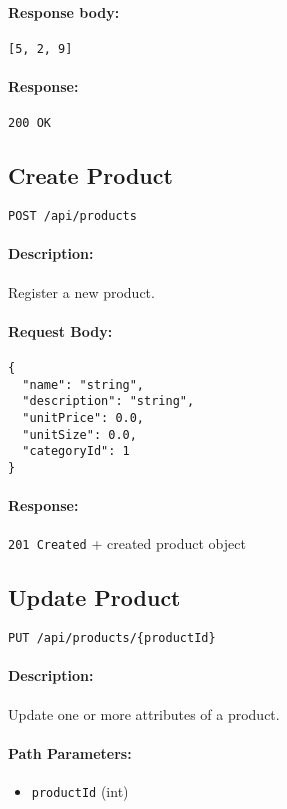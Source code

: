 \documentclass[a4paper,11pt]{article}
\begin{document}
\paragraph{Response body:}
\begin{verbatim}
[5, 2, 9]
\end{verbatim}
\paragraph{Response:} \texttt{200 OK}

\subsection{Create Product}
\label{sec:products-create}
\begin{verbatim}
POST /api/products
\end{verbatim}
\paragraph{Description:} Register a new product.
\paragraph{Request Body:}
\begin{verbatim}
{
  "name": "string",
  "description": "string",
  "unitPrice": 0.0,
  "unitSize": 0.0,
  "categoryId": 1
}
\end{verbatim}
\paragraph{Response:} \texttt{201 Created} + created product object

\subsection{Update Product}
\label{sec:products-update}
\begin{verbatim}
PUT /api/products/{productId}
\end{verbatim}
\paragraph{Description:} Update one or more attributes of a product.
\paragraph{Path Parameters:}
\begin{itemize}
  \item \texttt{productId} (int)
\end{itemize}
\end{document}
